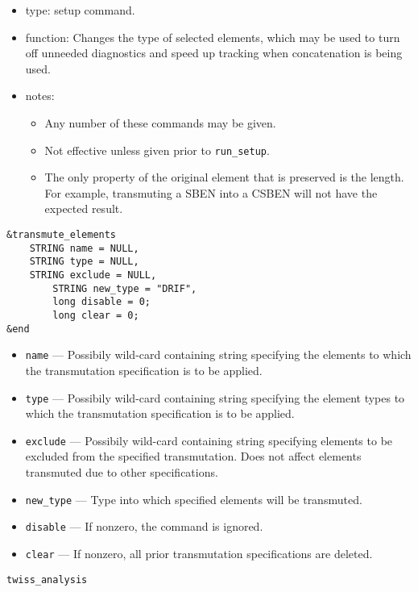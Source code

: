 \documentclass[11pt]{article}
\begin{document}
\begin{itemize}
\item type: setup command.
\item function: Changes the type of selected elements, which may be used to
	turn off unneeded diagnostics and speed up tracking when concatenation
	is being used.
\item notes: 
	\begin{itemize}
	\item Any number of these commands may be given.
	\item Not effective unless given prior to \verb|run_setup|.
	\item The only property of the original element that is preserved is
	the length.  For example, transmuting a SBEN into a CSBEN will not
	have the expected result.
	\end{itemize}
\end{itemize}

\begin{verbatim}
&transmute_elements
	STRING name = NULL,
	STRING type = NULL,
	STRING exclude = NULL,
        STRING new_type = "DRIF",
        long disable = 0;
        long clear = 0;
&end
\end{verbatim}

\begin{itemize}
\item \verb|name| --- Possibily wild-card containing string specifying the
	elements to which the transmutation specification is to be applied.
\item \verb|type| --- Possibily wild-card containing string specifying the
	element types to which the transmutation specification is to be applied.
\item \verb|exclude| --- Possibily wild-card containing string specifying 
	elements to be excluded from the specified transmutation.  Does not
	affect elements transmuted due to other specifications.
\item \verb|new_type| --- Type into which specified elements will be transmuted.
\item \verb|disable| --- If nonzero, the command is ignored.
\item \verb|clear| --- If nonzero, all prior transmutation specifications are deleted.
\end{itemize}

\begin{latexonly}
\newpage
\begin{center}{\Large\verb|twiss_analysis|}\end{center}
\end{latexonly}
\end{document}
